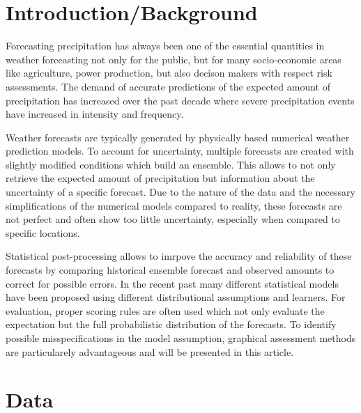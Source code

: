 \documentclass[twoside]{report}
\begin{document}

\maketitle



\section{Introduction/Background}

Forecasting precipitation has always been one of the essential quantities in
weather forecasting not only for the public, but for many socio-economic areas
like agriculture, power production, but also decison makers with respect risk
assessments. 
The demand of accurate predictions of the expected amount of precipitation has
increased over the past decade where severe precipitation events have increased
in intensity and frequency.

Weather forecasts are typically generated by physically based numerical weather
prediction models. To account for uncertainty, multiple forecasts are created
with slightly modified conditions which build an ensemble. This allows to not
only retrieve the expected amount of precipitation but information about the
uncertainty of a specific forecast.
Due to the nature of the data and the necessary  simplifications of the
numerical models compared to reality, these forecasts are not perfect and often
show too little uncertainty, especially when compared to specific locations.

Statistical post-processing allows to imrpove the accuracy and reliability
of these forecasts by comparing historical ensemble forecast and observed
amounts to correct for possible errors. In the recent past many different
statistical models have been proposed using different distributional assumptions
and learners. For evaluation, proper scoring rules are often used which not
only evaluate the expectation but the full probabilistic distribution of
the forecasts. To identify possible misspecifications in the model
assumption, graphical assessment methods are particularely advantageous
and will be presented in this article.

\section{Data}
\end{document}
